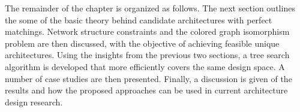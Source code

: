 The remainder of the chapter is organized as follows.
The next section outlines the some of the basic theory behind candidate architectures with perfect matchings.
Network structure constraints and the colored graph isomorphism problem are then discussed, with the objective of achieving feasible unique architectures.
Using the insights from the previous two sections, a tree search algorithm is developed that more efficiently covers the same design space.
A number of case studies are then presented.
Finally, a discussion is given of the results and how the proposed approaches can be used in current architecture design research.